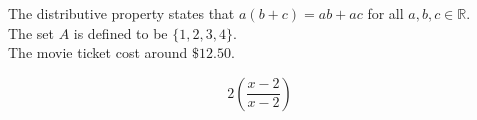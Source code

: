 \documentclass[12pt]{article}
\begin{document}
The distributive property states that $ a(b+c) = ab + ac$ for all $ a, b, c \in \mathbb{R}$.\\[6pt]
The set $A$ is defined to be $ \{1, 2, 3, 4\} $.\\[6pt]
The movie ticket cost around $ \$12.50 $.

\[ 2 (\frac{ x-2}{x-2}) \]


\end{document}
